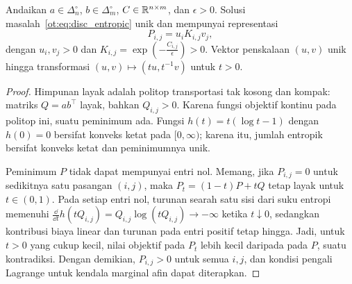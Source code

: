\begin{lemma}
    Andaikan $a\in\Delta_n^\circ$, $b\in\Delta_m^\circ$, $C\in\mathbb{R}^{n\times m}$, dan $\epsilon>0$. Solusi masalah~\eqref{ot:eq:disc_entropic} unik dan mempunyai representasi
    \begin{equation}
        P_{i,j}=u_iK_{i,j}v_j,
    \end{equation}
    dengan $u_i,v_j>0$ dan $K_{i,j}=\exp\left(-\frac{C_{i,j}}{\epsilon}\right)>0$. Vektor penskalaan $(u,v)$ unik hingga transformasi $(u,v)\mapsto(tu,t^{-1}v)$ untuk $t>0$.
\end{lemma}
\begin{proof}
    Himpunan layak adalah politop transportasi tak kosong dan kompak: matriks
    $Q=ab^\top$ layak, bahkan $Q_{i,j}>0$. Karena fungsi objektif kontinu pada
    politop ini, suatu peminimum ada. Fungsi
    $h(t)=t(\log t-1)$ dengan $h(0)=0$ bersifat konveks ketat pada
    $[0,\infty)$; karena itu, jumlah entropik bersifat konveks ketat dan
    peminimumnya unik.

    Peminimum $P$ tidak dapat mempunyai entri nol. Memang, jika
    $P_{i,j}=0$ untuk sedikitnya satu pasangan $(i,j)$, maka
    $P_t=(1-t)P+tQ$ tetap layak untuk $t\in(0,1)$. Pada setiap entri nol,
    turunan searah satu sisi dari suku entropi memenuhi
    $\frac{\dd}{\dd t}h(tQ_{i,j})=Q_{i,j}\log(tQ_{i,j})
    \rightarrow-\infty$ ketika $t\downarrow0$,
    sedangkan kontribusi biaya linear dan turunan pada entri positif tetap
    hingga. Jadi, untuk $t>0$ yang cukup kecil, nilai objektif pada $P_t$
    lebih kecil daripada pada $P$, suatu kontradiksi. Dengan demikian,
    $P_{i,j}>0$ untuk semua $i,j$, dan kondisi pengali Lagrange untuk kendala
    marginal afin dapat diterapkan.


\end{proof}
